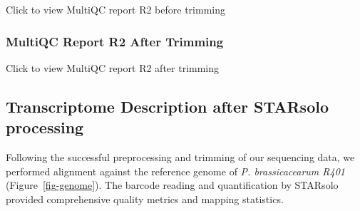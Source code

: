 \documentclass[
  11pt,
  a4paper,
]{report}
\begin{document}
Click to view MultiQC report R2 before trimming

\subsubsection{MultiQC Report R2 After
Trimming}\label{multiqc-report-r2-after-trimming}

Click to view MultiQC report R2 after trimming

\subsection{Transcriptome Description after STARsolo
processing}\label{transcriptome-description-after-starsolo-processing}

Following the successful preprocessing and trimming of our sequencing
data, we performed alignment against the reference genome of \emph{P.
brassicacearum R401} (Figure~\ref{fig-genome}). The barcode reading and
quantification by STARsolo provided comprehensive quality metrics and
mapping statistics.
\end{document}
